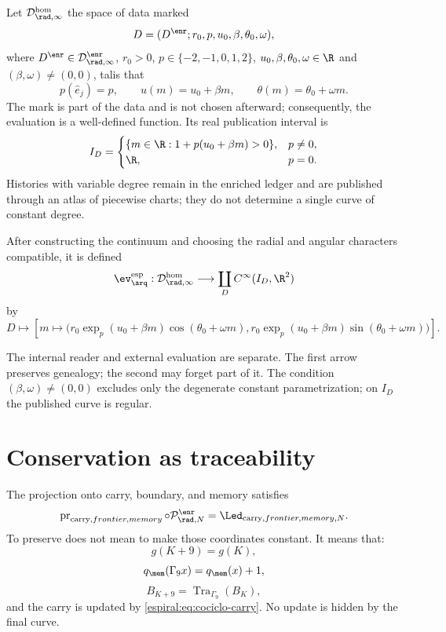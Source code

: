 \begin{definition}
Let \(\mathcal D_{\rad,\infty}^{\mathrm{hom}}\) the space of data marked
\[
 D=(D^{\enr};r_0,p,u_0,\beta,\theta_0,\omega),
\]
where \(D^{\enr}\in\mathcal D_{\rad,\infty}^{\enr}\), \(r_0>0\),
\(p\in\{-2,-1,0,1,2\}\), \(u_0,\beta,\theta_0,\omega\in\R\) and
\((\beta,\omega)\neq(0,0)\), talis that
\[
 p(\widehat e_j)=p,\qquad
 u(m)=u_0+\beta m,\qquad
 \theta(m)=\theta_0+\omega m.
\]
The mark is part of the data and is not chosen afterward; consequently, the evaluation
is a well-defined function.
Its real publication interval is
\[
 I_D=
 \begin{cases}
 \{m\in\R:1+p(u_0+\beta m)>0\},&p\neq0,\\
 \R,&p=0.
 \end{cases}
\]
Histories with variable degree remain in the enriched ledger and are published through an atlas of piecewise charts; they do not determine a single curve of constant degree.
\end{definition}

\begin{definition}
After constructing the continuum and choosing the radial and angular characters compatible, it is defined
\[
 \ev_{\arq}^{\mathrm{esp}}:
 \mathcal D_{\rad,\infty}^{\mathrm{hom}}\longrightarrow
 \coprod_{D}C^\infty(I_D,\R^2)
\]
by
\[
 D\longmapsto
 \left[m\longmapsto
 \bigl(r_0\exp_{p}(u_0+\beta m)\cos(\theta_0+\omega m),
 r_0\exp_{p}(u_0+\beta m)\sin(\theta_0+\omega m)\bigr)\right].
\]
\end{definition}

The internal reader and external evaluation are separate. The first arrow preserves genealogy; the second may forget part of it. The condition \((\beta,\omega)\neq(0,0)\) excludes only the degenerate constant parametrization; on \(I_D\) the published curve is regular.

\section{Conservation as traceability}

The projection onto carry, boundary, and memory satisfies
\[
 \operatorname{pr}_{\mathrm{carry},frontier,memory}
 \circ\mathcal P_{\rad,N}^{\enr}
 =\Led_{{\mathrm{carry},frontier,memory},N}.
\]
To preserve does not mean to make those coordinates constant. It means that:
\[
 g(K+9)=g(K),
\]
\[
 q_{\mem}(\Gamma_9x)=q_{\mem}(x)+1,
\]
\[
 B_{K+9}=\operatorname{Tra}_{\Gamma_9}(B_K),
\]
and the carry is updated by \cref{espiral:eq:cociclo-carry}. No update
is hidden by the final curve.

